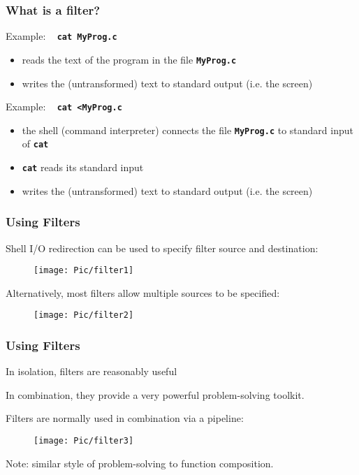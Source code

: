 \begin{frame}
\frametitle{What is a filter?}
Example: ~ \textbf{\tt{cat MyProg.c}}
\begin{itemize}
\item  reads the text of the program in the file \textbf{\tt{MyProg.c}}
\item  writes the (untransformed) text to standard output (i.e. the screen)
\end{itemize}
Example: ~ \textbf{\tt{cat {\textless}MyProg.c}}
\begin{itemize}
\item  the shell (command interpreter)
connects the file \textbf{\tt{MyProg.c}} to standard input of \textbf{\tt{cat}}
\item  \textbf{\tt{cat}} reads its standard input
\item  writes the (untransformed) text to standard output (i.e. the screen)
\end{itemize}
\end{frame}

\begin{frame}
\frametitle{Using Filters}
Shell I/O redirection can be used to specify filter source and destination:

	\begin{figure}
    	\centering
    	\texttt{[image: Pic/filter1]}
  	\end{figure}
Alternatively, most filters allow multiple sources to be specified:

	\begin{figure}
    	\centering
    	\texttt{[image: Pic/filter2]}
  	\end{figure}
\end{frame}

\begin{frame}
\frametitle{Using Filters}
In isolation, filters are reasonably useful

In combination, they provide a very powerful problem-solving toolkit.

Filters are normally used in combination via a pipeline:

	\begin{figure}
    	\centering
    	\texttt{[image: Pic/filter3]}
  	\end{figure}
Note: similar style of problem-solving to function composition.
\end{frame}

